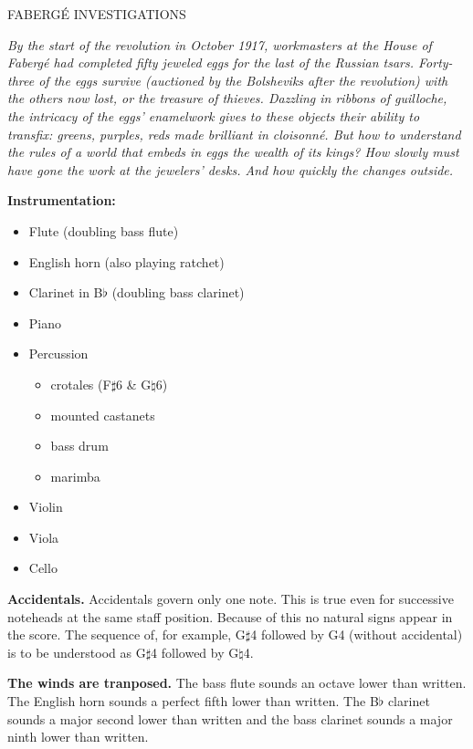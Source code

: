 \documentclass[10pt]{article}
\begin{document}
\begin{center}
{\huge FABERG\'{E} INVESTIGATIONS}
\end{center}

\vskip 0.5in

\textit{By the start of the revolution in October 1917, workmasters at the
House of Fabergé had completed fifty jeweled eggs for the last of the Russian
tsars. Forty-three of the eggs survive (auctioned by the Bolsheviks after the
revolution) with the others now lost, or the treasure of thieves. Dazzling in
ribbons of guilloche, the intricacy of the eggs' enamelwork gives to these
objects their ability to transfix: greens, purples, reds made brilliant in
cloisonné. But how to understand the rules of a world that embeds in eggs the
wealth of its kings? How slowly must have gone the work at the jewelers' desks.
And how quickly the changes outside.}

\textbf{Instrumentation:}

\begin{itemize} \itemsep2pt
\item Flute (doubling bass flute)
\item English horn (also playing ratchet)
\item Clarinet in B$\flat$ (doubling bass clarinet)
\item Piano
\item Percussion
    \begin{itemize}
    \item crotales (F$\sharp$6 \& G$\natural$6)
    \item mounted castanets
    \item bass drum
    \item marimba
    \end{itemize}
\item Violin
\item Viola
\item Cello
\end{itemize}

\textbf{Accidentals.} Accidentals govern only one note. This is true even for
successive noteheads at the same staff position. Because of this no natural
signs appear in the score. The sequence of, for example, G$\sharp$4 followed by
G4 (without accidental) is to be understood as G$\sharp$4 followed by
G$\natural$4.

\textbf{The winds are tranposed.} The bass flute sounds an octave lower than
written. The English horn sounds a perfect fifth lower than written. The
B$\flat$ clarinet sounds a major second lower than written and the bass
clarinet sounds a major ninth lower than written.
\end{document}
